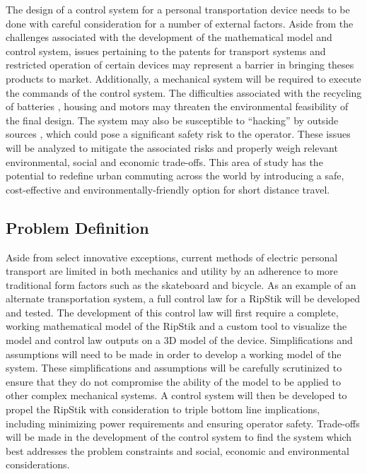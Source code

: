 The design of a control system for a personal transportation device needs to be done with careful consideration for a number of external factors. 
Aside from the challenges associated with the development of the mathematical model and control system, issues pertaining to the patents for transport systems \cite{casterboardPatent} and restricted operation of certain devices \cite{TOLaws} may represent a barrier in bringing theses products to market. 
Additionally, a mechanical system will be required to execute the commands of the control system. 
The difficulties associated with the recycling of batteries \cite{BatteryRecharge}, housing \cite{PlasticAssessment} and motors may threaten the environmental feasibility of the final design. 
The system may also be susceptible to ``hacking'' by outside sources \cite{DEFCON}, which could pose a significant safety risk to the operator. 
These issues will be analyzed to mitigate the associated risks and properly weigh relevant environmental, social and economic trade-offs.
This area of study has the potential to redefine urban commuting across the world by introducing a safe, cost-effective and environmentally-friendly option for short distance travel. 

\subsection{Problem Definition}

Aside from select innovative exceptions, current methods of electric personal transport are limited in both mechanics and utility by an adherence to more traditional form factors such as the skateboard and bicycle. 
As an example of an alternate transportation system, a full control law for a RipStik will be developed and tested. 
The development of this control law will first require a complete, working mathematical model of the RipStik and a custom tool to visualize the model and control law outputs on a 3D model of the device. 
Simplifications and assumptions will need to be made in order to develop a working model of the system. 
These simplifications and assumptions will be carefully scrutinized to ensure that they do not compromise the ability of the model to be applied to other complex mechanical systems. 
A control system will then be developed to propel the RipStik with consideration to triple bottom line implications, including minimizing power requirements and ensuring operator safety. 
Trade-offs will be made in the development of the control system to find the system which best addresses the problem constraints and social, economic and environmental considerations. 

